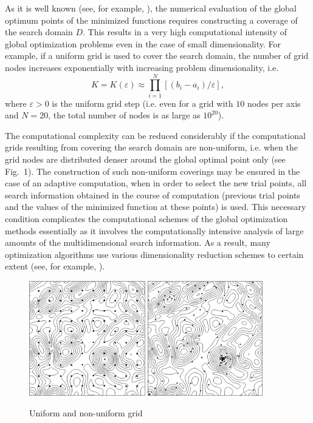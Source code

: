\documentclass[
11pt,%
tightenlines,%
twoside,%
onecolumn,%
nofloats,%
nobibnotes,%
nofootinbib,%
superscriptaddress,%
noshowpacs,%
centertags]%
{revtex4}
\begin{document}
As it is well known (see, for example, \cite{Strongin1}), the numerical evaluation of the global optimum points of the minimized functions requires constructing a coverage of the search domain $D$. This results in a very high computational intensity of global optimization problems even in the case of small dimensionality. For example, if a uniform grid is used to cover the search domain, the number of grid nodes increases exponentially with increasing problem dimensionality, i.e. 
\[
K = K(\varepsilon) \approx \prod_{i=1}^N[(b_i - a_i) / \varepsilon],
\]
where $\varepsilon > 0$ is the uniform grid step (i.e. even for a grid with $10$ nodes per axis and $N = 20$, the total number of nodes is as large as $10^{20}$).

The computational complexity can be reduced considerably if the computational grids resulting from covering the search domain are non-uniform, i.e. when the grid nodes are distributed denser around the global optimal point only (see Fig.~1). The construction of such non-uniform coverings may be ensured in the case of an adaptive computation, when in order to select the new trial points, all search information obtained in the course of computation (previous trial points and the values of the minimized function at these points) is used. This necessary condition complicates the computational schemes of the global optimization methods essentially as it involves the computationally intensive analysis of large amounts of the multidimensional search information. As a result, many optimization algorithms use various dimensionality reduction schemes to certain extent (see, for example, \cite{Strongin1, Strongin2, Sergeyev2}).

\begin{figure}
\centering
\includegraphics[height=5.0cm]{Fig1a}
\includegraphics[height=5.0cm]{Fig1b}
\caption{Uniform and non-uniform grid}
\label{fig:Fig1}
\end{figure}
\end{document}
